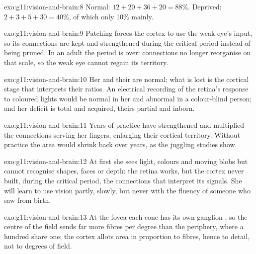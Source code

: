 \begin{solution}{exo:g11:vision-and-brain:8}
Normal: $12 + 20 + 36 + 20 = 88\%$. Deprived: $2 + 3 + 5 + 30 = 40\%$,
of which only 10\% mainly.
\end{solution}

\begin{solution}{exo:g11:vision-and-brain:9}
Patching forces the cortex to use the weak eye's input, so its
connections are kept and strengthened during the critical period
instead of being pruned. In an adult the period is over: connections
no longer reorganise on that scale, so the weak eye cannot regain its
territory.
\end{solution}

\begin{solution}{exo:g11:vision-and-brain:10}
Her  and their  are normal; what is lost is the cortical
stage that interprets their ratios. An electrical recording of the
retina's response to coloured lights would be normal in her and
abnormal in a colour-blind person; and her deficit is total and
acquired, theirs partial and inborn.
\end{solution}

\begin{solution}{exo:g11:vision-and-brain:11}
Years of practice have strengthened and multiplied the connections
serving her fingers, enlarging their cortical territory. Without
practice the area would shrink back over years, as the juggling
studies show.
\end{solution}

\begin{solution}{exo:g11:vision-and-brain:12}
At first she sees light, colours and moving blobs but cannot
recognise shapes, faces or depth: the retina works, but the cortex
never built, during the critical period, the connections that
interpret its signals. She will learn to use vision partly, slowly,
but never with the fluency of someone who saw from birth.
\end{solution}

\begin{solution}{exo:g11:vision-and-brain:13}
At the fovea each cone has its own ganglion , so the centre of
the field sends far more fibres per degree than the periphery, where
a hundred  share one; the cortex allots area in proportion to
fibres, hence to detail, not to degrees of field.
\end{solution}


